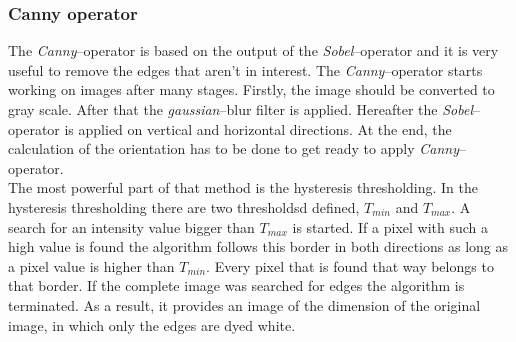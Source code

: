 \documentclass[journal,final,a4paper,twoside]{PS}
\begin{document}
\subsubsection{Canny operator}
The \emph{Canny}--operator is based on the output of the \emph{Sobel}--operator and it is very useful to remove the edges that aren't in interest. 
The \emph{Canny}--operator starts working on images after many stages. Firstly, the image should be converted to gray scale. After that the \emph{gaussian}--blur filter is applied. Hereafter the \emph{Sobel}--operator is applied on vertical and horizontal directions. At the end, the calculation of the orientation has to be done to get ready to apply \emph{Canny}--operator.
\\
The most powerful part of that method is the hysteresis thresholding. In the hysteresis thresholding there are two thresholdsd defined, $T_{min}$ and $T_{max}$. A search for an intensity value bigger than $T_{max}$ is started. If a pixel with such a high value is found the algorithm follows this border in both directions as long as a pixel value is higher than $T_{min}$. Every pixel that is found that way belongs to that border. If the complete image was searched for edges the algorithm is terminated. As a result, it provides an image of the dimension of the original image, in which only the edges are dyed white.
\end{document}
